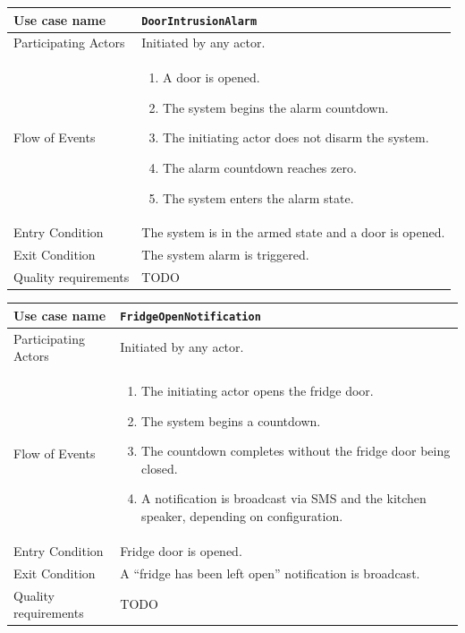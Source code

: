 \documentclass{report}
\begin{document}
\begin{tabular}{| l | p{12cm} |}
\hline
Use case name & \texttt{DoorIntrusionAlarm} \\ \hline
Participating Actors & Initiated by any actor. \\ \hline
Flow of Events & 

\begin{enumerate}
 \item A door is opened.
 \item The system begins the alarm countdown.
 \item The initiating actor does not disarm the system.
 \item The alarm countdown reaches zero.
 \item The system enters the alarm state.
\end{enumerate}

\\ \hline

Entry Condition & The system is in the armed state and a door is opened. \\ \hline
Exit Condition & The system alarm is triggered. \\ \hline
Quality requirements & TODO \\ \hline

\hline
\end{tabular}

\begin{tabular}{| l | p{12cm} |}
\hline
Use case name & \texttt{FridgeOpenNotification} \\ \hline
Participating Actors & Initiated by any actor. \\ \hline
Flow of Events & 

\begin{enumerate}
 \item The initiating actor opens the fridge door.
 \item The system begins a countdown.
 \item The countdown completes without the fridge door being closed.
 \item A notification is broadcast via SMS and the kitchen speaker, depending on configuration.
\end{enumerate}

\\ \hline

Entry Condition & Fridge door is opened. \\ \hline
Exit Condition & A ``fridge has been left open'' notification is broadcast. \\ \hline
Quality requirements & TODO \\ \hline

\hline
\end{tabular}
\end{document}
